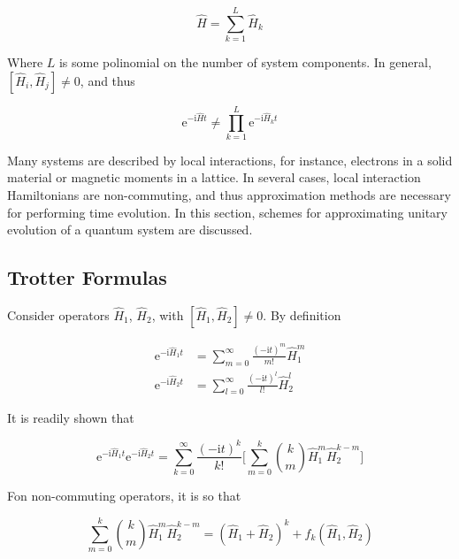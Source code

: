   \begin{equation}
    \hat{H} = \sum_{k = 1}^{L} \hat{H}_k
    \label{eq:SparseHam}
  \end{equation}

  Where $L$ is some polinomial on the number of system components. In general, $[\hat{H}_i,\hat{H}_j] \neq 0$, and thus

  \begin{equation}
    \mathrm{e}^{-\mathrm{i}\hat{H}t} \neq \prod_{k = 1}^{L} \mathrm{e}^{-\mathrm{i}\hat{H}_kt}
    \label{eq:CommuteUnit}
  \end{equation}

  Many systems are described by local interactions, for instance, electrons in a solid material or magnetic moments in a lattice. In several cases, local interaction Hamiltonians are non-commuting, and thus approximation methods are necessary for performing time evolution. In this section, schemes for approximating unitary evolution of a quantum system are discussed. 

  \subsection{Trotter Formulas}

  Consider operators $\hat{H}_1$, $\hat{H}_2$, with $[\hat{H}_1,\hat{H}_2] \neq 0$. By definition

  \begin{align}
    \mathrm{e}^{-\mathrm{i}\hat{H}_1 t} & = \sum_{m = 0}^{\infty} \frac{(-\mathrm{i}t)^m}{m!}\hat{H}_1^m \\
    \mathrm{e}^{-\mathrm{i}\hat{H}_2 t} & = \sum_{l = 0}^{\infty} \frac{(-\mathrm{i}t)^l}{l!}\hat{H}_2^l
    \label{eq:ExpSeries}
  \end{align}

  It is readily shown that

  \begin{equation}
    \mathrm{e}^{-\mathrm{i}\hat{H}_1 t}\mathrm{e}^{-\mathrm{i}\hat{H}_2 t} = \sum_{k = 0}^{\infty} \frac{(-\mathrm{i}t)^k}{k!} \Bigg[\sum_{m = 0}^k \binom{k}{m} \hat{H}_1^m \hat{H}_2^{k-m}\Bigg]
    \label{eq:ExpProdExact}
  \end{equation}

  Fon non-commuting operators, it is so that

  \begin{equation}
    \sum_{m = 0}^k \binom{k}{m} \hat{H}_1^m \hat{H}_2^{k-m} = (\hat{H}_1 + \hat{H}_2)^k + f_k(\hat{H}_1,\hat{H}_2)
    \label{eq:BinomialTheorem}
  \end{equation}

